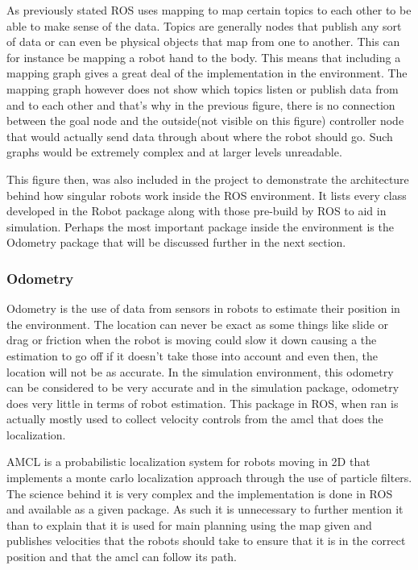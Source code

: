       As previously stated ROS uses mapping to map certain topics to each other to be able to make sense of the data. Topics are generally nodes that publish any sort of data or can even be physical objects that map from one to another. This can for instance be mapping a robot hand to the body. This means that including a mapping graph gives a great deal of the implementation in the environment. The mapping graph however does not show which topics listen or publish data from and to each other and that's why in the previous figure, there is no connection between the goal node and the outside(not visible on this figure) controller node that would actually send data through about where the robot should go. Such graphs would be extremely complex and at larger levels unreadable.

      This figure then, was also included in the project to demonstrate the architecture behind how singular robots work inside the ROS environment. It lists every class developed in the Robot package along with those pre-build by ROS to aid in simulation. Perhaps the most important package inside the environment is the Odometry package that will be discussed further in the next section.

    \subsubsection{Odometry}
      Odometry is the use of data from sensors in robots to estimate their position in the environment. The location can never be exact as some things like slide or drag or friction when the robot is moving could slow it down causing a the estimation to go off if it doesn't take those into account and even then, the location will not be as accurate. In the simulation environment, this odometry can be considered to be very accurate and in the simulation package, odometry does very little in terms of robot estimation. This package in ROS, when ran is actually mostly used to collect velocity controls from the amcl that does the localization.

      AMCL is a probabilistic localization system for robots moving in 2D that implements a monte carlo localization approach through the use of particle filters. The science behind it is very complex and the implementation is done in ROS and available as a given package. As such it is unnecessary to further mention it than to explain that it is used for main planning using the map given and publishes velocities that the robots should take to ensure that it is in the correct position and that the amcl can follow its path.

